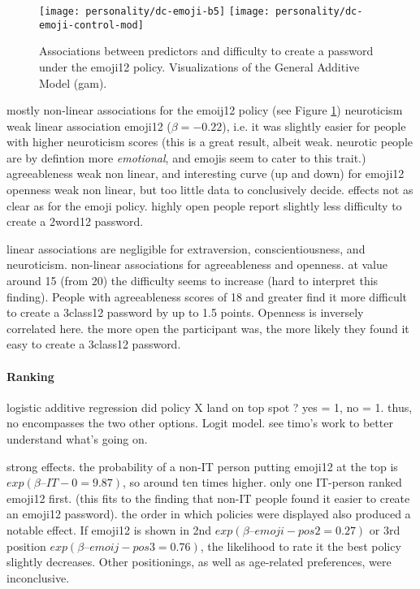 \begin{figure}
\texttt{[image: personality/dc-emoji-b5]}
\texttt{[image: personality/dc-emoji-control-mod]}
\caption{\label{fig:personality:dc-emoji-b5}Associations between predictors and difficulty to create a password under the emoji12 policy. Visualizations of the General Additive Model (gam).}
\end{figure}
mostly non-linear associations for the emoij12 policy (see Figure \ref{fig:personality:dc-emoji-b5})
neuroticism weak linear association emoji12 ($\beta=-0.22$), i.e. it was slightly easier for people with higher neuroticism scores (this is a great result, albeit weak. neurotic people are by defintion more \textit{emotional}, and emojis seem to cater to this trait.)
agreeableness weak non linear, and interesting curve (up and down) for emoji12
openness weak non linear, but too little data to conclusively decide. 
effects not as clear as for the emoji policy. highly open people report slightly less difficulty to create a 2word12 password.

linear associations are negligible for extraversion, conscientiousness, and neuroticism. 
non-linear associations for agreeableness and openness. at value around 15 (from 20) the difficulty seems to increase (hard to interpret this finding). People with agreeableness scores of 18 and greater find it more difficult to create a 3class12 password by up to 1.5 points. Openness is inversely correlated here. the more open the participant was, the more likely they found it easy to create a 3class12 password. 


\paragraph{Ranking}
logistic additive regression %
did policy X land on top spot ? yes = 1, no = 1. thus, no encompasses the two other options.
Logit model. see timo's work to better understand what's going on. 



strong effects. the probability of a non-IT person putting emoji12 at the top is $exp(\beta–{IT-0}=9.87)$, so around ten times higher. only one IT-person ranked emoji12 first. (this fits to the finding that non-IT people found it easier to create an emoji12 password).
the order in which policies were displayed also produced a notable effect. If emoji12 is shown in 2nd $exp(\beta–{emoji-pos2}=0.27)$ or 3rd position $exp(\beta–{emoij-pos3}=0.76)$, the likelihood to rate it the best policy slightly decreases. Other positionings, as well as age-related preferences, were inconclusive.

